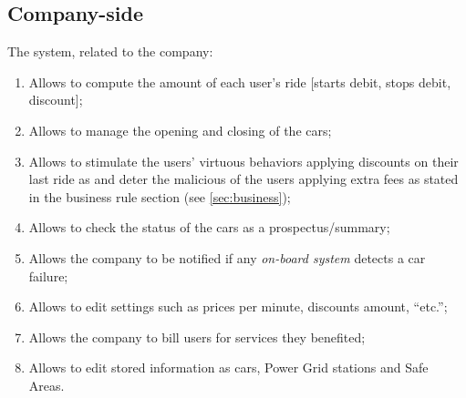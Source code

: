 \documentclass{scrreprt}
\begin{document}
\subsection{Company-side}
The system, related to the company:

\begin{enumerate} [label=G\arabic*., resume]
\item Allows to compute the amount of each user's ride [starts debit, stops debit, discount];
\item Allows to manage the opening and closing of the cars;
\item Allows to stimulate the users' virtuous behaviors applying discounts on their last ride as and deter the malicious of the users applying extra fees as stated in the business rule section (see \vref{sec:business});
\item Allows to check the status of the cars as a prospectus/summary;
\item Allows the company to be notified if any {\itshape on-board system} detects a car failure;
\item Allows to edit settings such as prices per minute, discounts amount, “etc.”;
\item Allows the company to bill users for services they benefited;
\item Allows to edit stored information as cars, Power Grid stations and Safe Areas.
\end{enumerate}

\begin{comment}$<$Summarize the major functions the product must perform or must let the user perform. Details will be provided in Section 3, so only a high level summary 
(such as a bullet list) is needed here. Organize the functions to make them 
understandable to any reader of the SRS. A picture of the major groups of 
related requirements and how they relate, such as a top level data flow diagram 
or object class diagram, is often effective.$>$
\end{comment}
\end{document}
